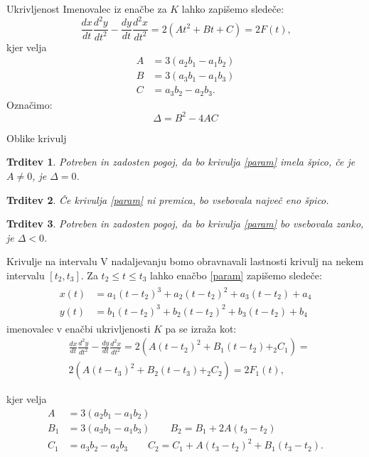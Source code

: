 \documentclass{beamer} %
\newtheorem{trditev}{Trditev}
\begin{document}
\begin{frame}{Ukrivljenost}
Imenovalec iz enačbe za $K$ lahko zapišemo sledeče:
\[\frac{dx}{dt}\frac{d^2y}{dt^2} - \frac{dy}{dt}\frac{d^2x}{dt^2} = 2(At^2 + Bt +C) = 2F(t) \text{,}\]
kjer velja
	\begin{align*}
	A &= 3(a_2b_1-a_1b_2)\\
	B &= 3(a_3b_1 -a_1b_3) \\
	C &= a_3b_2-a_2b_3 \text{.}
	\end{align*}
Označimo:
\[\Delta = B^2- 4AC\]
\end{frame}

\begin{frame}{Oblike krivulj}
	\begin{trditev}
		Potreben in zadosten pogoj, da bo krivulja \eqref{param} imela špico, če je $A \neq 0$, je $\Delta = 0$.
	\end{trditev}
	\begin{trditev}
		Če krivulja \eqref{param} ni premica, bo vsebovala največ eno špico.
	\end{trditev}
	\begin{trditev}
		Potreben in zadosten pogoj, da bo krivulja \eqref{param} bo vsebovala zanko, je $\Delta <0$.
	\end{trditev}
		
\end{frame}

\begin{frame}{Krivulje na intervalu}
	V nadaljevanju bomo obravnavali lastnosti krivulj na nekem intervalu $[t_2,t_3]$. Za $t_2 \leq t \leq t_3$ lahko enačbo \eqref{param} zapišemo sledeče:
	\begin{align}
	\begin{split}
		x(t) &= a_1(t-t_2)^3+a_2(t-t_2)^2+a_3(t-t_2)+a_4 \\
		y(t) &= b_1(t-t_2)^3+b_2(t-t_2)^2+b_3(t-t_2)+b_4 
		\label{int}
	\end{split}
	\end{align}
	imenovalec v enačbi ukrivljenosti $K$ pa se izraža kot:
	 \begin{align*}
	 &\frac{dx}{dt}\frac{d^2y}{dt^2} - \frac{dy}{dt}\frac{d^2x}{dt^2} = 2(A(t-t_2)^2 + B_1(t-t_2) +_2C_1) = \\
	 &2(A(t-t_3)^2 + B_2(t-t_3) +_2C_2) = 
	 2F_1(t) \text{,}
	 \end{align*}
	 
	 kjer velja
	 	\begin{align*}
	 A &= 3(a_2b_1-a_1b_2)\\
	 B_1 &= 3(a_3b_1 -a_1b_3)  \qquad B_2 = B_1 +2A(t_3-t_2) \\
	 C_1 &= a_3b_2-a_2b_3  \qquad C_2 = C_1 +A(t_3-t_2)^2+B_1(t_3-t_2) \text{.}
	 \end{align*}
	
 \end{frame}
\end{document}
